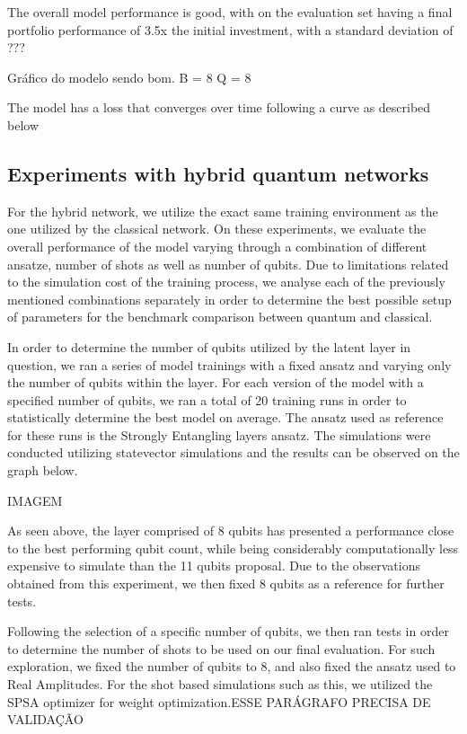 The overall model performance is good, with on the evaluation set having a final portfolio performance of 3.5x the initial investment, with a standard deviation of {???}

Gráfico do modelo sendo bom. B = 8 Q = 8

The model has a loss that converges over time following a curve as described below

\subsection{Experiments with hybrid quantum networks}
For the hybrid network, we utilize the exact same training environment as the one utilized by the classical network. On these experiments, we evaluate the overall performance of the model varying through a combination of different ansatze, number of shots as well as number of qubits. Due to limitations related to the simulation cost of the training process, we analyse each of the previously mentioned combinations separately in order to determine the best possible setup of parameters for the benchmark comparison between quantum and classical.

In order to determine the number of qubits utilized by the latent layer in question, we ran a series of model trainings with a fixed ansatz and varying only the number of qubits within the layer. For each version of the model with a specified number of qubits, we ran a total of 20 training runs in order to statistically determine the best model on average. The ansatz used as reference for these runs is the Strongly Entangling layers ansatz. The simulations were conducted utilizing statevector simulations and the results can be observed on the graph below.

IMAGEM

As seen above, the layer comprised of 8 qubits has presented a performance close to the best performing qubit count, while being considerably computationally less expensive to simulate than the 11 qubits proposal. Due to the observations obtained from this experiment, we then fixed 8 qubits as a reference for further tests.

Following the selection of a specific number of qubits, we then ran tests in order to determine the number of shots to be used on our final evaluation. For such exploration, we fixed the number of qubits to 8, and also fixed the ansatz used to Real Amplitudes. For the shot based simulations such as this, 
we utilized the SPSA optimizer for weight optimization.{ESSE PARÁGRAFO PRECISA DE VALIDAÇÃO}

